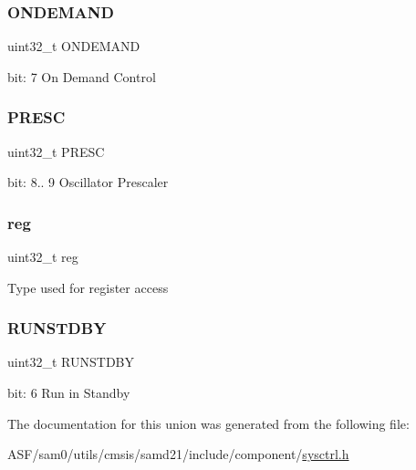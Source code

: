 \subsubsection{\texorpdfstring{ONDEMAND}{ONDEMAND}}
{\footnotesize\ttfamily uint32\+\_\+t O\+N\+D\+E\+M\+A\+ND}

bit\+: 7 On Demand Control \mbox{\label{union_s_y_s_c_t_r_l___o_s_c8_m___type_a52a3855939a63f81f3aa6fa215094ea5}} 
\subsubsection{\texorpdfstring{PRESC}{PRESC}}
{\footnotesize\ttfamily uint32\+\_\+t P\+R\+E\+SC}

bit\+: 8.. 9 Oscillator Prescaler \mbox{\label{union_s_y_s_c_t_r_l___o_s_c8_m___type_a6b91636401516a477989a336376d7b40}} 
\subsubsection{\texorpdfstring{reg}{reg}}
{\footnotesize\ttfamily uint32\+\_\+t reg}

Type used for register access \mbox{\label{union_s_y_s_c_t_r_l___o_s_c8_m___type_a5656560aef3eaf5aac89b68b9fe39c3a}} 
\subsubsection{\texorpdfstring{RUNSTDBY}{RUNSTDBY}}
{\footnotesize\ttfamily uint32\+\_\+t R\+U\+N\+S\+T\+D\+BY}

bit\+: 6 Run in Standby 

The documentation for this union was generated from the following file\+:\begin{DoxyCompactItemize}
\item 
A\+S\+F/sam0/utils/cmsis/samd21/include/component/\mbox{\hyperlink{component_2sysctrl_8h}{sysctrl.\+h}}\end{DoxyCompactItemize}
